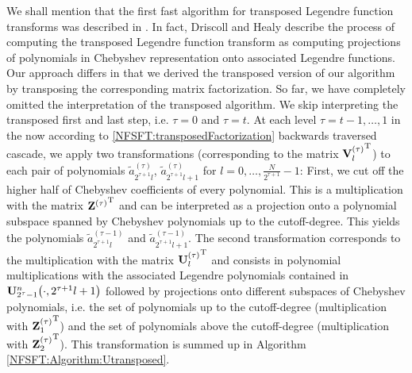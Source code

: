 We shall mention that the first fast 
algorithm for transposed Legendre function transforms was described in \cite{drhe}. In fact, Driscoll and Healy describe the process of 
computing the transposed Legendre function transform as computing projections of polynomials in Chebyshev representation onto 
associated Legendre functions. Our approach differs in that we derived the transposed version of our algorithm by transposing 
the corresponding matrix factorization. So far, we have completely omitted the interpretation of the transposed algorithm. 
We skip interpreting the transposed first and last step, i.e. $\tau = 0$ and $\tau = t$. At each level 
$\tau = t-1,\ldots,1$ in the now according to \eqref{NFSFT:transposedFactorization} backwards traversed cascade, we apply
two transformations (corresponding to the matrix ${\mathbf{V}^{(\tau)}_l}^{\text{\rm{T}}}$) to each pair of polynomials 
$\tilde{a}_{2^{\tau+1}l}^{(\tau)}$, $\tilde{a}_{2^{\tau+1}l+1}^{(\tau)}$ for $l=0,\ldots,\frac{N}{2^{\tau+1}}-1$:
First, we cut off the higher half of Chebyshev coefficients of every polynomial. This is a multiplication with the 
matrix ${\mathbf{Z}^{(\tau)}}^{\text{\rm{T}}}$ and can be interpreted as a projection onto a polynomial subspace spanned by Chebyshev polynomials 
up to the cutoff-degree. This yields the polynomials $\tilde{a}_{2^{\tau+1}l}^{(\tau-1)}$ and $\tilde{a}_{2^{\tau+1}l+1}^{(\tau-1)}$.
The second transformation corresponds to the multiplication with the matrix ${\mathbf{U}^{(\tau)}_l}^{\text{\rm{T}}}$ and consists in
polynomial multiplications with the associated Legendre polynomials contained in 
$\mathbf{U}_{2^{\tau}-1}^{n}{\hspace{-0.4ex}}\left(\cdot,2^{\tau+1}l+1\right)$ followed by projections onto different subspaces of Chebyshev 
polynomials, i.e. the set of polynomials up to the cutoff-degree (multiplication with ${\mathbf{Z}_{1}^{(\tau)}}^{\text{\rm{T}}}$) and the set of 
polynomials above the cutoff-degree (multiplication with ${\mathbf{Z}_{2}^{(\tau)}}^{\text{\rm{T}}}$). This transformation is summed up 
in Algorithm \ref{NFSFT:Algorithm:Utransposed}.
